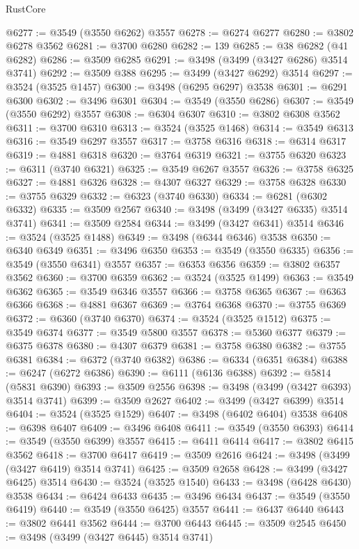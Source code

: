 \begin{lexlean}{RustCore}
\begin{coremodule}
@6277 := @3549 (@3550 @6262) @3557
@6278 := @6274 @6277
@6280 := @3802 @6278 @3562
@6281 := @3700 @6280
@6282 := 139
@6285 := @38 @6282 (@41 @6282)
@6286 := @3509 @6285
@6291 := @3498 (@3499 (@3427 @6286) @3514 @3741)
@6292 := @3509 @388
@6295 := @3499 (@3427 @6292) @3514
@6297 := @3524 (@3525 @1457)
@6300 := @3498 (@6295 @6297) @3538
@6301 := @6291 @6300
@6302 := @3496 @6301
@6304 := @3549 (@3550 @6286)
@6307 := @3549 (@3550 @6292) @3557
@6308 := @6304 @6307
@6310 := @3802 @6308 @3562
@6311 := @3700 @6310
@6313 := @3524 (@3525 @1468)
@6314 := @3549 @6313
@6316 := @3549 @6297 @3557
@6317 := @3758 @6316
@6318 := @6314 @6317
@6319 := @4881 @6318
@6320 := @3764 @6319
@6321 := @3755 @6320
@6323 := @6311 (@3740 @6321)
@6325 := @3549 @6267 @3557
@6326 := @3758 @6325
@6327 := @4881 @6326
@6328 := @4307 @6327
@6329 := @3758 @6328
@6330 := @3755 @6329
@6332 := @6323 (@3740 @6330)
@6334 := @6281 (@6302 @6332)
@6335 := @3509 @2567
@6340 := @3498 (@3499 (@3427 @6335) @3514 @3741)
@6341 := @3509 @2584
@6344 := @3499 (@3427 @6341) @3514
@6346 := @3524 (@3525 @1488)
@6349 := @3498 (@6344 @6346) @3538
@6350 := @6340 @6349
@6351 := @3496 @6350
@6353 := @3549 (@3550 @6335)
@6356 := @3549 (@3550 @6341) @3557
@6357 := @6353 @6356
@6359 := @3802 @6357 @3562
@6360 := @3700 @6359
@6362 := @3524 (@3525 @1499)
@6363 := @3549 @6362
@6365 := @3549 @6346 @3557
@6366 := @3758 @6365
@6367 := @6363 @6366
@6368 := @4881 @6367
@6369 := @3764 @6368
@6370 := @3755 @6369
@6372 := @6360 (@3740 @6370)
@6374 := @3524 (@3525 @1512)
@6375 := @3549 @6374
@6377 := @3549 @5800 @3557
@6378 := @5360 @6377
@6379 := @6375 @6378
@6380 := @4307 @6379
@6381 := @3758 @6380
@6382 := @3755 @6381
@6384 := @6372 (@3740 @6382)
@6386 := @6334 (@6351 @6384)
@6388 := @6247 (@6272 @6386)
@6390 := @6111 (@6136 @6388)
@6392 := @5814 (@5831 @6390)
@6393 := @3509 @2556
@6398 := @3498 (@3499 (@3427 @6393) @3514 @3741)
@6399 := @3509 @2627
@6402 := @3499 (@3427 @6399) @3514
@6404 := @3524 (@3525 @1529)
@6407 := @3498 (@6402 @6404) @3538
@6408 := @6398 @6407
@6409 := @3496 @6408
@6411 := @3549 (@3550 @6393)
@6414 := @3549 (@3550 @6399) @3557
@6415 := @6411 @6414
@6417 := @3802 @6415 @3562
@6418 := @3700 @6417
@6419 := @3509 @2616
@6424 := @3498 (@3499 (@3427 @6419) @3514 @3741)
@6425 := @3509 @2658
@6428 := @3499 (@3427 @6425) @3514
@6430 := @3524 (@3525 @1540)
@6433 := @3498 (@6428 @6430) @3538
@6434 := @6424 @6433
@6435 := @3496 @6434
@6437 := @3549 (@3550 @6419)
@6440 := @3549 (@3550 @6425) @3557
@6441 := @6437 @6440
@6443 := @3802 @6441 @3562
@6444 := @3700 @6443
@6445 := @3509 @2545
@6450 := @3498 (@3499 (@3427 @6445) @3514 @3741)

\end{coremodule}
\end{lexlean}
